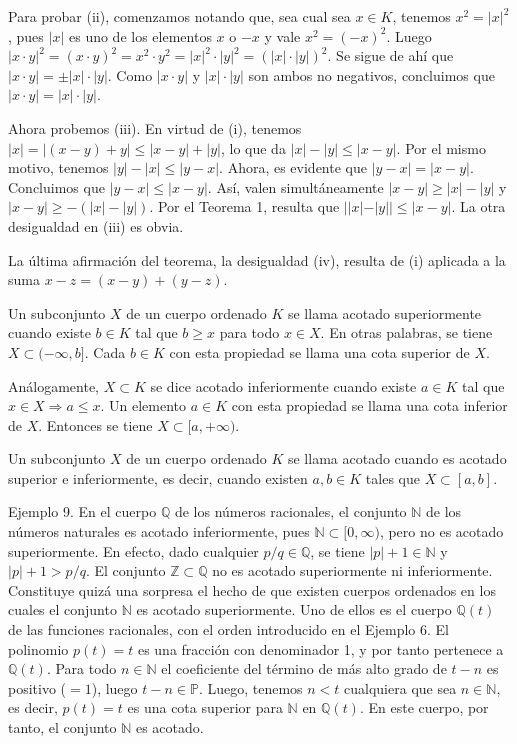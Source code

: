 \documentclass[12pt,oneside]{book}
\begin{document}
Para probar (ii), comenzamos notando que, sea cual sea \(x \in K\), tenemos \(x^2 = |x|^2\), pues \(|x|\) es uno de los elementos \(x\) o \(-x\) y vale \(x^2 = (-x)^2\). Luego \(|x \cdot y|^2 = (x \cdot y)^2 = x^2 \cdot y^2 = |x|^2 \cdot |y|^2 = (|x| \cdot |y|)^2\). Se sigue de ahí que \(|x \cdot y| = \pm |x| \cdot |y|\). Como \(|x \cdot y|\) y \(|x| \cdot |y|\) son ambos no negativos, concluimos que \(|x \cdot y| = |x| \cdot |y|\).

Ahora probemos (iii). En virtud de (i), tenemos \(|x| = |(x - y) + y| \leq |x - y| + |y|\), lo que da \(|x| - |y| \leq |x - y|\). Por el mismo motivo, tenemos \(|y| - |x| \leq |y - x|\). Ahora, es evidente que \(|y - x| = |x - y|\). Concluimos que \(|y - x| \leq |x - y|\). Así, valen simultáneamente \(|x - y| \geq |x| - |y|\) y \(|x - y| \geq -(|x| - |y|)\). Por el Teorema 1, resulta que \(||x| - |y|| \leq |x - y|\). La otra desigualdad en (iii) es obvia.

La última afirmación del teorema, la desigualdad (iv), resulta de (i) aplicada a la suma \(x - z = (x - y) + (y - z)\).

Un subconjunto \(X\) de un cuerpo ordenado \(K\) se llama acotado superiormente cuando existe \(b \in K\) tal que \(b \ge x\) para todo \(x \in X\). En otras palabras, se tiene \(X \subset (-\infty, b]\). Cada \(b \in K\) con esta propiedad se llama una cota superior de \(X\).

Análogamente, \(X \subset K\) se dice acotado inferiormente cuando existe \(a \in K\) tal que \(x \in X \Rightarrow a \le x\). Un elemento \(a \in K\) con esta propiedad se llama una cota inferior de \(X\). Entonces se tiene \(X \subset [a, +\infty)\).

Un subconjunto \(X\) de un cuerpo ordenado \(K\) se llama acotado cuando es acotado superior e inferiormente, es decir, cuando existen \(a, b \in K\) tales que \(X \subset [a, b]\).

Ejemplo 9. En el cuerpo \(\mathbb{Q}\) de los números racionales, el conjunto \(\mathbb{N}\) de los números naturales es acotado inferiormente, pues \(\mathbb{N} \subset [0, \infty)\), pero no es acotado superiormente. En efecto, dado cualquier \(p/q \in \mathbb{Q}\), se tiene \(|p| + 1 \in \mathbb{N}\) y \(|p| + 1 > p/q\). El conjunto \(\mathbb{Z} \subset \mathbb{Q}\) no es acotado superiormente ni inferiormente. Constituye quizá una sorpresa el hecho de que existen cuerpos ordenados en los cuales el conjunto \(\mathbb{N}\) es acotado superiormente. Uno de ellos es el cuerpo \(\mathbb{Q}(t)\) de las funciones racionales, con el orden introducido en el Ejemplo 6. El polinomio \(p(t) = t\) es una fracción con denominador 1, y por tanto pertenece a \(\mathbb{Q}(t)\). Para todo \(n \in \mathbb{N}\) el coeficiente del término de más alto grado de \(t - n\) es positivo (\(= 1\)), luego \(t - n \in \mathbb{P}\). Luego, tenemos \(n < t\) cualquiera que sea \(n \in \mathbb{N}\), es decir, \(p(t) = t\) es una cota superior para \(\mathbb{N}\) en \(\mathbb{Q}(t)\). En este cuerpo, por tanto, el conjunto \(\mathbb{N}\) es acotado.
\end{document}
